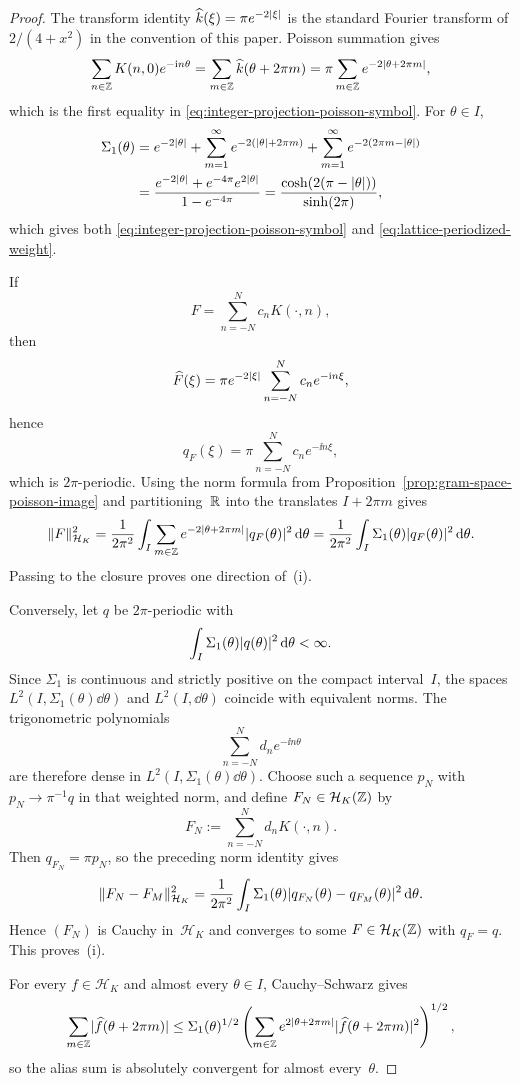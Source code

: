\begin{proof}
The transform identity
\(\widehat k(\xi)=\pi e^{-2\lvert \xi\rvert}\) is the standard Fourier transform
of \(2/(4+x^2)\) in the convention of this paper.  Poisson summation gives
\[
\sum_{n\in\mathbb{Z}}K(n,0)e^{-\mathrm{i} n\theta}
=\sum_{m\in\mathbb{Z}}\widehat k(\theta+2\pi m)
=\pi\sum_{m\in\mathbb{Z}}e^{-2\lvert \theta+2\pi m\rvert},
\]
which is the first equality in \eqref{eq:integer-projection-poisson-symbol}.
For $\theta\in I$,
\begin{align*}
\Sigma_1(\theta)
&=e^{-2\lvert \theta\rvert}
+\sum_{m=1}^{\infty}e^{-2(\lvert \theta\rvert+2\pi m)}
+\sum_{m=1}^{\infty}e^{-2(2\pi m-\lvert \theta\rvert)} \\
&=\frac{e^{-2\lvert \theta\rvert}+e^{-4\pi}e^{2\lvert \theta\rvert}}{1-e^{-4\pi}}
=\frac{\cosh(2(\pi-\lvert \theta\rvert))}{\sinh(2\pi)},
\end{align*}
which gives both \eqref{eq:integer-projection-poisson-symbol} and
\eqref{eq:lattice-periodized-weight}.

If
\[
F=\sum_{n=-N}^{N}c_nK(\cdot,n),
\]
then
\[
\widehat F(\xi)=\pi e^{-2\lvert \xi\rvert}\sum_{n=-N}^{N}c_ne^{-\mathrm{i} n\xi},
\]
hence
\[
q_F(\xi)=\pi\sum_{n=-N}^{N}c_ne^{-\ii n\xi},
\]
which is $2\pi$-periodic.  Using the norm formula from
Proposition~\ref{prop:gram-space-poisson-image} and partitioning~$\mathbb{R}$
into the translates $I+2\pi m$ gives
\[
\|F\|_{\mathcal H_K}^2
=\frac{1}{2\pi^2}\int_I
\sum_{m\in\mathbb{Z}}e^{-2\lvert \theta+2\pi m\rvert}\lvert q_F(\theta)\rvert^2\,\mathrm{d}\theta
=\frac{1}{2\pi^2}\int_I\Sigma_1(\theta)\lvert q_F(\theta)\rvert^2\,\mathrm{d}\theta.
\]
Passing to the closure proves one direction of~(i).

Conversely, let $q$ be $2\pi$-periodic with
\[
\int_I\Sigma_1(\theta)\lvert q(\theta)\rvert^2\,\mathrm{d}\theta<\infty.
\]
Since $\Sigma_1$ is continuous and strictly positive on the compact
interval~$I$, the spaces
$L^2(I,\Sigma_1(\theta)\dd\theta)$ and $L^2(I,\dd\theta)$ coincide with
equivalent norms.  The trigonometric polynomials
\[
\sum_{n=-N}^{N}d_ne^{-\ii n\theta}
\]
are therefore dense in $L^2(I,\Sigma_1(\theta)\dd\theta)$.  Choose such a
sequence $p_N$ with $p_N\to \pi^{-1}q$ in that weighted norm, and define
$F_N\in\mathcal H_K(\mathbb{Z})$ by
\[
F_N:=\sum_{n=-N}^{N}d_nK(\cdot,n).
\]
Then $q_{F_N}=\pi p_N$, so the preceding norm identity gives
\[
\|F_N-F_M\|_{\mathcal H_K}^2
=\frac{1}{2\pi^2}\int_I\Sigma_1(\theta)
\lvert q_{F_N}(\theta)-q_{F_M}(\theta)\rvert^2\,\mathrm{d}\theta.
\]
Hence $(F_N)$ is Cauchy in~$\mathcal H_K$ and converges to some
$F\in\mathcal H_K(\mathbb{Z})$ with $q_F=q$.  This proves~(i).

For every $f\in\mathcal H_K$ and almost every $\theta\in I$,
Cauchy--Schwarz gives
\[
\sum_{m\in\mathbb{Z}}\lvert \widehat f(\theta+2\pi m)\rvert
\le
\Sigma_1(\theta)^{1/2}
\left(
\sum_{m\in\mathbb{Z}}e^{2\lvert \theta+2\pi m\rvert}
\lvert \widehat f(\theta+2\pi m)\rvert^2
\right)^{1/2},
\]
so the alias sum is absolutely convergent for almost every~$\theta$.


\end{proof}
